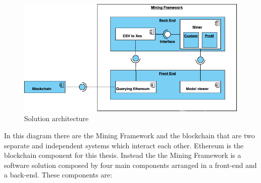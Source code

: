 \begin{figure}[!ht]
    \centering
\includegraphics[width=\textwidth]{images/component_diagram.png}
    \caption{Solution architecture}
    \label{images:desing_architecture}
\end{figure}

In this diagram there are the Mining Framework and the blockchain that are two separate and independent systems which interact 
each other. Ethereum is the blockchain component for this thesis. Instead the the Mining Framework is a software solution 
composed by four main components arranged in a front-end and a back-end. These components are:

